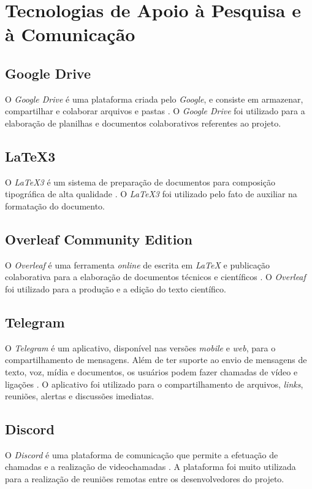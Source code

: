 \section{Tecnologias de Apoio à Pesquisa e à Comunicação}

\label{tec_apoio_pesquisa_comunicacao}

\subsection{Google Drive}
O \textit{Google Drive} é uma plataforma criada pelo \textit{Google}, e consiste em armazenar, compartilhar e colaborar arquivos e pastas \cite{drive}. O \textit{Google Drive} foi utilizado para a elaboração de planilhas e documentos colaborativos referentes ao projeto.

\subsection{LaTeX3}
O \textit{LaTeX3} é um sistema de preparação de documentos para composição tipográfica de alta qualidade \cite{latex}. O \textit{LaTeX3} foi utilizado pelo fato de auxiliar na formatação do documento.

\subsection{Overleaf Community Edition}
O \textit{Overleaf} é uma ferramenta \textit{online} de escrita em \textit{LaTeX} e publicação colaborativa para a elaboração de documentos técnicos e científicos \cite{overleaf}. O \textit{Overleaf} foi utilizado para a produção e a edição do texto científico.

\subsection{Telegram}
O \textit{Telegram} é um aplicativo, disponível nas versões \textit{mobile} e \textit{web}, para o compartilhamento de mensagens. Além de ter suporte ao envio de mensagens de texto, voz, mídia e documentos, os usuários podem fazer chamadas de vídeo e ligações \cite{telegram}. O aplicativo foi utilizado para o compartilhamento de arquivos, \textit{links}, reuniões, alertas e discussões imediatas.

\subsection{Discord}
O \textit{Discord} é uma plataforma de comunicação que permite a efetuação de chamadas e a realização de videochamadas \cite{discord}. A plataforma foi muito utilizada para a realização de reuniões remotas entre os desenvolvedores do projeto.

